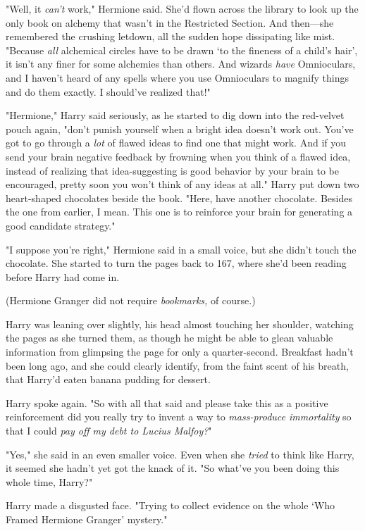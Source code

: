 "Well, it \emph{can't} work," Hermione said. She'd flown across the library to
look up the only book on alchemy that wasn't in the Restricted Section. And
then---she remembered the crushing letdown, all the sudden hope dissipating
like mist. "Because \emph{all} alchemical circles have to be drawn `to the
fineness of a child's hair', it isn't any finer for some alchemies than others.
And wizards \emph{have} Omnioculars, and I haven't heard of any spells where
you use Omnioculars to magnify things and do them exactly. I should've realized
that!"

"Hermione," Harry said seriously, as he started to dig down into the red-velvet
pouch again, "don't punish yourself when a bright idea doesn't work out. You've
got to go through a \emph{lot} of flawed ideas to find one that might work. And
if you send your brain negative feedback by frowning when you think of a flawed
idea, instead of realizing that idea-suggesting is good behavior by your brain
to be encouraged, pretty soon you won't think of any ideas at all." Harry put
down two heart-shaped chocolates beside the book. "Here, have another
chocolate. Besides the one from earlier, I mean. This one is to reinforce your
brain for generating a good candidate strategy."

"I suppose you're right," Hermione said in a small voice, but she didn't touch
the chocolate. She started to turn the pages back to 167, where she'd been
reading before Harry had come in.

(Hermione Granger did not require \emph{bookmarks,} of course.)

Harry was leaning over slightly, his head almost touching her shoulder,
watching the pages as she turned them, as though he might be able to glean
valuable information from glimpsing the page for only a quarter-second.
Breakfast hadn't been long ago, and she could clearly identify, from the faint
scent of his breath, that Harry'd eaten banana pudding for dessert.

Harry spoke again. "So with all that said{\el} and please take this as a
positive reinforcement{\el} did you really try to invent a way to
\emph{mass-produce immortality} so that I could \emph{pay off my debt to Lucius
Malfoy?}"

"Yes," she said in an even smaller voice. Even when she \emph{tried} to think
like Harry, it seemed she hadn't yet got the knack of it. "So what've you been
doing this whole time, Harry?"

Harry made a disgusted face. "Trying to collect evidence on the whole `Who
Framed Hermione Granger' mystery."

